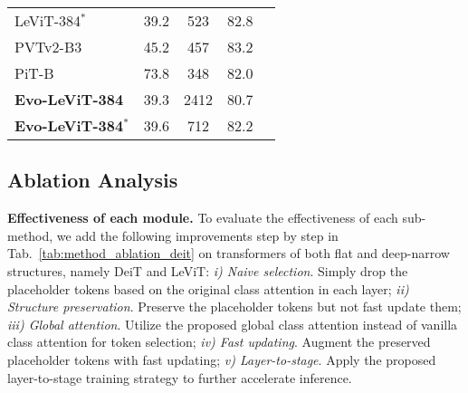 \documentclass[letterpaper]{article} \usepackage{aaai22}  \usepackage{times}  \usepackage{helvet}  \usepackage{courier}  \usepackage[hyphens]{url}  \usepackage{graphicx} \urlstyle{rm} \def\UrlFont{\rm}  \usepackage{natbib}  \usepackage{caption} \DeclareCaptionStyle{ruled}{labelfont=normalfont,labelsep=colon,strut=off} \frenchspacing  \setlength{\pdfpagewidth}{8.5in}  \setlength{\pdfpageheight}{11in}  \usepackage{algorithm}
\begin{document}
\begin{table}[t]
{{\begin{tabular}{l|cccc}
    LeViT-384$^{*}$ &     39.2          &   523     &     82.8      \\
    PVTv2-B3      &    45.2          &      457     &     83.2      \\
PiT-B    &     73.8           &    348       &      82.0         \\ \midrule
\textbf{Evo-LeViT-384}  &     39.3          &    2412    &     80.7      \\
    \textbf{Evo-LeViT-384$^{*}$}  &     39.6          &    712    &   82.2        \\
    \bottomrule
    \end{tabular}
    }
    }
    \vspace{-3mm}
\end{table}
%
 \subsection{Ablation Analysis}
\textbf{Effectiveness of each module.}
To evaluate the effectiveness of each sub-method, we add the following improvements step by step in Tab.~\ref{tab:method_ablation_deit} on transformers of both flat and deep-narrow structures, namely DeiT and LeViT:
\textit{i) Naive selection}. Simply drop the placeholder tokens based on the original class attention in each layer;
\textit{ii) Structure preservation}. Preserve the placeholder tokens but not fast update them;
\textit{iii) Global attention}. Utilize the proposed global class attention instead of vanilla class attention for token selection;
\textit{iv) Fast updating}. Augment the preserved placeholder tokens with fast updating;
\textit{v) Layer-to-stage}. Apply the proposed layer-to-stage training strategy to further accelerate inference.
\end{document}
